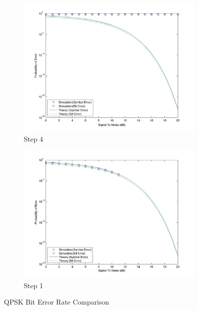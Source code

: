 \documentclass[]{article}
\begin{document}
\begin{figure}[h]
        \centering
        \begin{subfigure}[b]{0.4\textwidth}
                \includegraphics[width=\textwidth]{qpSNR.jpg}
                \caption{Step 4}
                \label{fig:pqSNR}
        \end{subfigure}%
        \qquad \quad %
        \begin{subfigure}[b]{0.4\textwidth}
                \includegraphics[width=\textwidth]{qpSNRstep1.jpg}
                \caption{Step 1}
                \label{fig:qpSNR1}
        \end{subfigure}
        \caption{QPSK Bit Error Rate Comparison \label{fig:qpsk}}
\end{figure}
\end{document}
